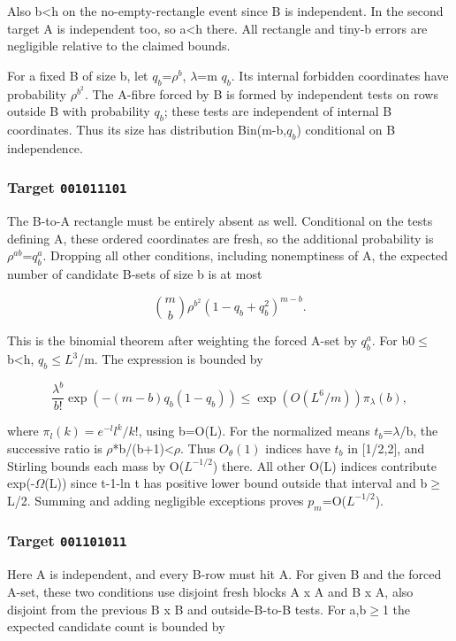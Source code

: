 \documentclass[11pt]{article}
\begin{document}
Also b<h on the no-empty-rectangle event since B is independent. In the second target A is independent too, so a<h there. All rectangle and tiny-b errors are negligible relative to the claimed bounds.

For a fixed B of size b, let $q_{b}$=$\rho^{b}$, $\lambda$=m $q_{b}$. Its internal forbidden coordinates have probability $\rho^{b^2}$. The A-fibre forced by B is formed by independent tests on rows outside B with probability $q_{b}$; these tests are independent of internal B coordinates. Thus its size has distribution Bin(m-b,$q_{b}$) conditional on B independence.

\subsubsection{Target \texttt{001011101}}

The B-to-A rectangle must be entirely absent as well. Conditional on the tests defining A, these ordered coordinates are fresh, so the additional probability is $\rho^{ab}$=$q_b^a$. Dropping all other conditions, including nonemptiness of A, the expected number of candidate B-sets of size b is at most

\[
\binom mb\rho^{b^2}(1-q_b+q_b^2)^{m-b}.
\]

This is the binomial theorem after weighting the forced A-set by $q_b^a$. For b0\ensuremath{\leq}b<h, $q_{b}$\ensuremath{\leq}$L^{3}$/m. The expression is bounded by

\[
\frac{\lambda^b}{b!}\exp(-(m-b)q_b(1-q_b))
\leq\exp(O(L^6/m))\pi_\lambda(b),
\]

where $\pi_l(k)=e^{-l}l^k/k!$, using b=O(L). For the normalized means $t_{b}$=$\lambda$/b, the successive ratio is $\rho$*b/(b+1)<$\rho$. Thus $O_\theta(1)$ indices have $t_{b}$ in [1/2,2], and Stirling bounds each mass by O($L^{-1/2}$) there. All other O(L) indices contribute exp(-$\Omega$(L)) since t-1-ln t has positive lower bound outside that interval and b\ensuremath{\geq}L/2. Summing and adding negligible exceptions proves $p_m$=O($L^{-1/2}$).

\subsubsection{Target \texttt{001101011}}

Here A is independent, and every B-row must hit A. For given B and the forced A-set, these two conditions use disjoint fresh blocks A x A and B x A, also disjoint from the previous B x B and outside-B-to-B tests. For a,b\ensuremath{\geq}1 the expected candidate count is bounded by
\end{document}
